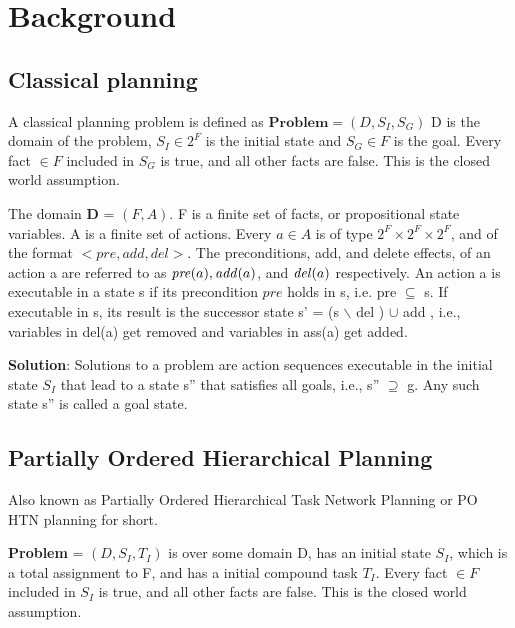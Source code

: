 \chapter{Background}\label{chap:background}

\section{Classical planning}
A classical planning problem is defined as $\textbf{Problem} = (D, S_I, S_G)$ \newline
D is the domain of the problem, 
$S_I \in 2^F$ is the initial state and $S_G \in F$ is the goal. \newline
Every fact $\in F$ included in $S_G$ is true, and all other facts are false. This is the closed world assumption.

The domain \textbf{D} = $(F, A)$. 
F is a finite set of facts, or propositional state variables.
A is a finite set of actions. 
Every $a \in A$ is of type $2^F \times 2^F \times 2^F$, and of the format $<pre, add, del>$. 
The preconditions, add, and delete effects, of an action a are referred to as $\mathit{pre}(a), \mathit{add}(a)$, and $\mathit{del}(a)$ respectively.
An action a is executable in a state s if its precondition $pre$ holds in s, i.e. pre $\subseteq$ s. 
If executable in s, its result is the successor state s' = (s $\backslash$ del ) $\cup$ add , i.e., variables in del(a) get removed and variables in ass(a) get added.

\textbf{Solution}: Solutions to a problem are action sequences executable in the initial state $S_I$ that lead to a state s'' that satisfies all
goals, i.e., s'' $ \supseteq$ g. Any such state s'' is called a goal state.

\newpage
\section{Partially Ordered Hierarchical Planning}
Also known as Partially Ordered Hierarchical Task Network Planning or PO HTN planning for short.


\textbf{Problem} = $(D, S_I, T_I)$
is over some domain D, 
has an initial state $S_I$, which is a total assignment to F, and 
has a initial compound task $T_I$. 
Every fact $\in F$ included in $S_I$ is true, and all other facts are false. This is the closed world assumption.

